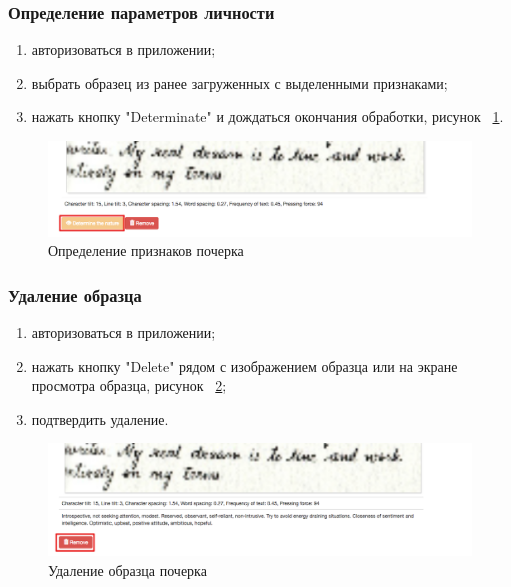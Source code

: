 \subsubsection{Определение параметров личности}
\label{sec:manpage:client_man:determ_nature}
\begin{enumerate}
    \item[1)] авторизоваться в приложении;
    \item[2)] выбрать образец из ранее загруженных с выделенными признаками;
    \item[3)] нажать кнопку "Determinate" и дождаться окончания обработки, рисунок ~\ref{fig:manpage:client_man:determinate_nature}.
\end{enumerate}

\begin{figure}[ht]
    \centering
    \includegraphics[width=0.6\textheight]{figures/determinate_nature.png}
    \caption{Определение признаков почерка}
    \label{fig:manpage:client_man:determinate_nature}
\end{figure}

\subsubsection{Удаление образца}
\label{sec:manpage:client_man:delete_sample}
\begin{enumerate}
    \item[1)] авторизоваться в приложении;
    \item[2)] нажать кнопку "Delete" рядом с изображением образца или на экране просмотра образца, рисунок ~\ref{fig:manpage:client_man:delete_sample};
    \item[3)] подтвердить удаление.
\end{enumerate}

\begin{figure}[ht]
    \centering
    \includegraphics[width=0.6\textheight]{figures/delete_sample.png}
    \caption{Удаление образца почерка}
    \label{fig:manpage:client_man:delete_sample}
\end{figure}


